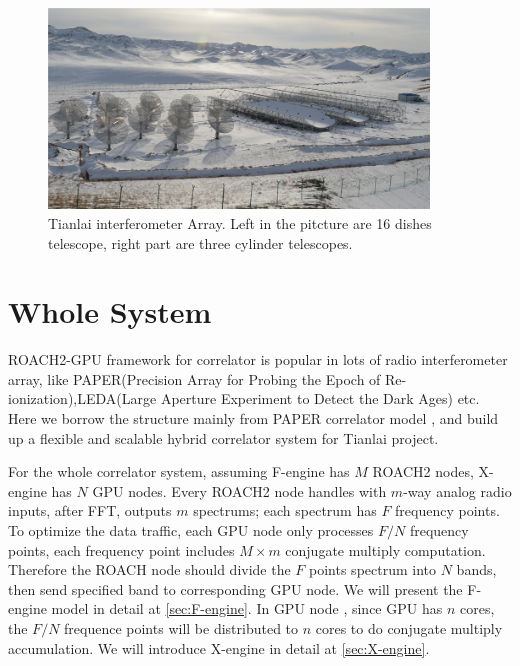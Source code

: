 \documentclass{ws-jai}
\begin{document}
\begin{figure}[t]
 \centering
 \includegraphics[width=0.9\textwidth]{./picture/Tianlai.jpg}
\caption{Tianlai interferometer Array. Left in the pitcture are 16 dishes telescope, right part are three cylinder telescopes.\label{fig:Tianlai}}
\end{figure}

\section{Whole System}\label{sec:1}
  

	ROACH2-GPU framework for correlator is popular in lots of radio interferometer array, like PAPER(Precision Array for Probing the Epoch of Re-ionization)\cite{2010AJ....139.1468P},LEDA(Large Aperture Experiment to Detect the Dark Ages) etc. Here we borrow the structure mainly from PAPER correlator model \cite{2008PASP..120.1207P}, and build up a flexible and scalable hybrid correlator system for Tianlai project.
	
	 For the whole correlator system, assuming F-engine has $M$ ROACH2 nodes,  X-engine has $N$ GPU nodes.  Every ROACH2 node handles  with $m$-way analog radio inputs, after FFT, outputs $m$ spectrums; each spectrum has $F$ frequency points. To optimize the data traffic, each GPU node only processes ${F}/{N}$ frequency points,  each frequency point includes $M\times m$ conjugate multiply computation. Therefore the ROACH node should divide the $F$ points spectrum into $N$ bands, then send specified band to corresponding GPU node. We will present the F-engine model in detail at \ref{sec:F-engine}. In GPU node ,  since GPU has $n$ cores,  the ${F}/{N}$ frequence points will be  distributed to $n$ cores to do conjugate multiply accumulation. We will introduce X-engine in detail at \ref{sec:X-engine}.            
	  
\end{document}
